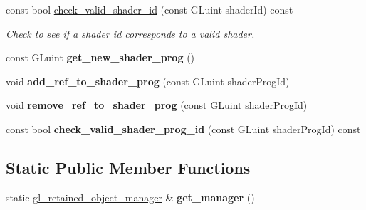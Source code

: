 \begin{DoxyCompactItemize}
const bool \hyperlink{classoccluded_1_1opengl_1_1retained_1_1gl__retained__object__manager_a0d9da23aa7e604fb57cc00fd329a5c5a}{check\+\_\+valid\+\_\+shader\+\_\+id} (const G\+Luint shader\+Id) const 
\begin{DoxyCompactList}\small\item\em Check to see if a shader id corresponds to a valid shader. \end{DoxyCompactList}\item 
\hypertarget{classoccluded_1_1opengl_1_1retained_1_1gl__retained__object__manager_acc5fccf6b51baeac3f6249aeb4095850}{const G\+Luint {\bfseries get\+\_\+new\+\_\+shader\+\_\+prog} ()}\label{classoccluded_1_1opengl_1_1retained_1_1gl__retained__object__manager_acc5fccf6b51baeac3f6249aeb4095850}

\item 
\hypertarget{classoccluded_1_1opengl_1_1retained_1_1gl__retained__object__manager_a90717d2177dd938a6c53ad5f73026509}{void {\bfseries add\+\_\+ref\+\_\+to\+\_\+shader\+\_\+prog} (const G\+Luint shader\+Prog\+Id)}\label{classoccluded_1_1opengl_1_1retained_1_1gl__retained__object__manager_a90717d2177dd938a6c53ad5f73026509}

\item 
\hypertarget{classoccluded_1_1opengl_1_1retained_1_1gl__retained__object__manager_a55173b690384cf3d6e94a28656bb5af5}{void {\bfseries remove\+\_\+ref\+\_\+to\+\_\+shader\+\_\+prog} (const G\+Luint shader\+Prog\+Id)}\label{classoccluded_1_1opengl_1_1retained_1_1gl__retained__object__manager_a55173b690384cf3d6e94a28656bb5af5}

\item 
\hypertarget{classoccluded_1_1opengl_1_1retained_1_1gl__retained__object__manager_a6ded0a1a2f02c8d2cb348e1023bfd736}{const bool {\bfseries check\+\_\+valid\+\_\+shader\+\_\+prog\+\_\+id} (const G\+Luint shader\+Prog\+Id) const }\label{classoccluded_1_1opengl_1_1retained_1_1gl__retained__object__manager_a6ded0a1a2f02c8d2cb348e1023bfd736}

\end{DoxyCompactItemize}
\subsection*{Static Public Member Functions}
\begin{DoxyCompactItemize}
\item 
\hypertarget{classoccluded_1_1opengl_1_1retained_1_1gl__retained__object__manager_a4dfa20b34cf794c189f69a88d902b83a}{static \hyperlink{classoccluded_1_1opengl_1_1retained_1_1gl__retained__object__manager}{gl\+\_\+retained\+\_\+object\+\_\+manager} \& {\bfseries get\+\_\+manager} ()}\label{classoccluded_1_1opengl_1_1retained_1_1gl__retained__object__manager_a4dfa20b34cf794c189f69a88d902b83a}

\end{DoxyCompactItemize}


